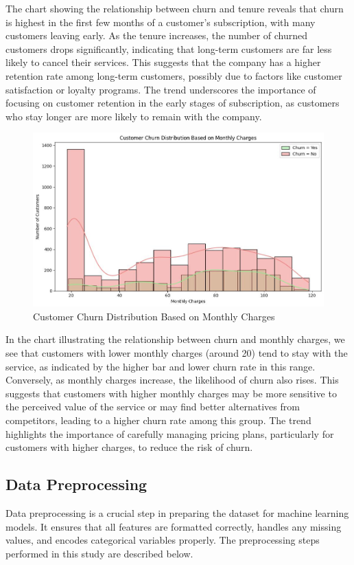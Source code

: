 The chart showing the relationship between churn and tenure reveals that churn is highest in the first few months of a customer’s subscription, with many customers leaving early. As the tenure increases, the number of churned customers drops significantly, indicating that long-term customers are far less likely to cancel their services. This suggests that the company has a higher retention rate among long-term customers, possibly due to factors like customer satisfaction or loyalty programs. The trend underscores the importance of focusing on customer retention in the early stages of subscription, as customers who stay longer are more likely to remain with the company.\\

\begin{figure}[hbt!]
    \centering
    \includegraphics[width=1\linewidth]{Images/2.3.e.jpg}
    \caption{Customer Churn Distribution  Based on Monthly Charges}
    \label{fig:enter-label}
\end{figure}

In the chart illustrating the relationship between churn and monthly charges, we see that customers with lower monthly charges (around 20) tend to stay with the service, as indicated by the higher bar and lower churn rate in this range. Conversely, as monthly charges increase, the likelihood of churn also rises. This suggests that customers with higher monthly charges may be more sensitive to the perceived value of the service or may find better alternatives from competitors, leading to a higher churn rate among this group. The trend highlights the importance of carefully managing pricing plans, particularly for customers with higher charges, to reduce the risk of churn.

\subsection{Data Preprocessing}
Data preprocessing is a crucial step in preparing the dataset for machine learning models. It ensures that all features are formatted correctly, handles any missing values, and encodes categorical variables properly. The preprocessing steps performed in this study are described below.\\


